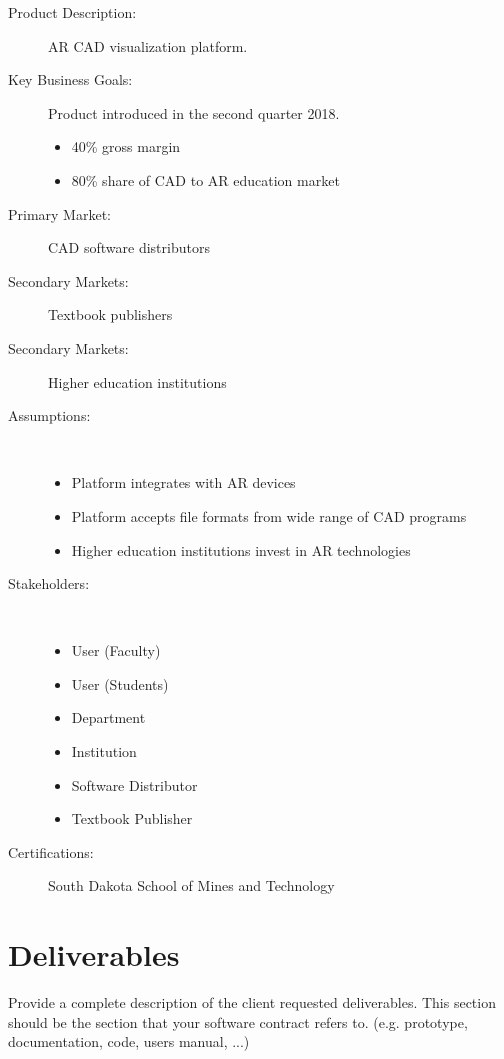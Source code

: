 \begin{description}
	\item [Product Description:] AR CAD visualization platform.
	
	\item [Key Business Goals:] Product introduced in the second quarter 2018.
	\begin{itemize}
		\item 40\% gross margin
		\item 80\% share of CAD to AR education market
	\end{itemize}
	
	\item [Primary Market:] CAD software distributors
	\item [Secondary Markets:] Textbook publishers
	\item [Secondary Markets:] Higher education institutions
	
	\item [Assumptions:]  ~~ \\
	\begin{itemize}
		\item Platform integrates with AR devices 
		\item Platform accepts file formats from wide range of CAD programs
		\item Higher education institutions invest in AR technologies
	\end{itemize}
	
	\item [Stakeholders:]  ~~ \\
	\begin{itemize}
		\item User (Faculty)
		\item User (Students)
		\item Department
		\item Institution
		\item Software Distributor
		\item Textbook Publisher
	\end{itemize}
	
	\item [Certifications:] South Dakota School of Mines and Technology
\end{description}

\section{Deliverables}

Provide a complete description of the client requested deliverables.   This section should be the section that your software contract refers to.
(e.g. prototype, documentation, code, users manual, ...)
 


